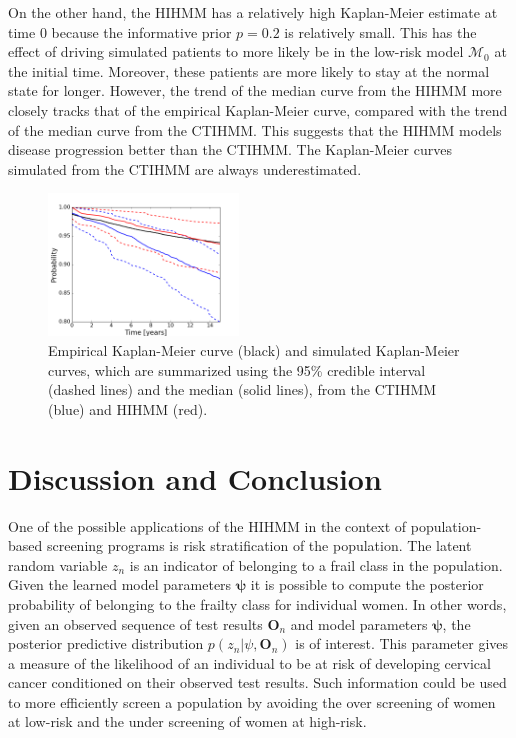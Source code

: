 \documentclass{article}
\begin{document}
On the other hand, the HIHMM has a relatively high Kaplan-Meier estimate at time $0$ because the informative prior $p = 0.2$ is relatively small. This has the effect of driving simulated patients to more likely be in the low-risk model $\mathcal{M_0}$ at the initial time. Moreover, these patients are more likely to stay at the normal state for longer. However, the trend of the median curve from the HIHMM more closely tracks that of the empirical Kaplan-Meier curve, compared with the trend of the median curve from the CTIHMM. This suggests that the HIHMM models disease progression better than the CTIHMM. The Kaplan-Meier curves simulated from the CTIHMM are always underestimated.
\begin{figure}
	\centering
    \includegraphics[width = 0.45\textwidth]{pic/hmm/KM_curve_shared_version1}
	\caption{Empirical Kaplan-Meier curve (black) and simulated Kaplan-Meier curves, which are summarized using the 95\% credible interval (dashed lines) and the median (solid lines), from the CTIHMM (blue) and HIHMM (red).}
	\label{KM}
\end{figure}

\section{Discussion and Conclusion}
One of the possible applications of the HIHMM in the context of population-based screening programs is risk stratification of the population.  The latent random variable $z_n$ is an indicator of belonging to a frail class in the population.  Given the learned model parameters $\bm \psi$  it is possible to compute the posterior probability of belonging to the frailty class for individual women.  In other words, given an observed sequence of test results ${\bm O}_n$ and model parameters  $\bm \psi$,  the posterior predictive distribution $p(z_n | \psi, {\bm O}_n)$ is of interest.  This parameter gives a measure of the likelihood of an individual to be at risk of developing cervical cancer conditioned on their observed test results. Such information could be used to more efficiently screen a population by avoiding the over screening of women at low-risk and the under screening of women at high-risk.  
\end{document}
